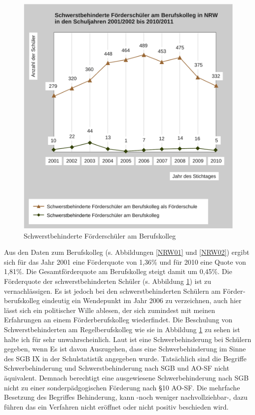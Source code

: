 \begin{figure}[htbp]
\centering
\includegraphics[width=\ScaleIfNeeded]{nrw03.pdf}%
\caption{Schwerstbehinderte Förderschüler am Berufskolleg}%
\label{NRW03}
\end{figure}

Aus den Daten zum Berufskolleg (s. Abbildungen \ref{NRW01} und \ref{NRW02}) ergibt sich für das Jahr 2001 eine Förderquote von 1,36\% und für 2010 eine Quote von 1,81\%.  Die Gesamt­förder­quote am Berufskolleg steigt damit um 0,45\%. Die Förderquote der schwerstbehinderten Schüler (s. Abbildung \ref{NRW03}) ist zu vernachlässigen. Es ist jedoch bei den schwerst­behinderten Schülern am Förder­berufs­kolleg eindeutig ein Wendepunkt im Jahr 2006 zu verzeichnen, auch hier lässt sich ein politischer Wille ablesen, der sich zumindest mit meinen Erfahrungen an einem Förderberufskolleg wiederfindet. Die Beschulung von Schwerstbehinderten am Regelberufskolleg wie sie in Abbildung \ref{NRW03} zu sehen ist halte ich für sehr unwahrscheinlich. Laut \citep{AOSF:05} ist eine Schwerbehinderung bei Schülern gegeben, wenn 
Es ist davon Auszugehen, dass eine Schwerbehinderung im Sinne des SGB IX in der Schulstatistik angegeben wurde. Tatsächlich sind die Begriffe Schwerbehinderung und Schwerstbehinderung nach SGB und AO-SF nicht äquivalent. Demnach berechtigt eine ausgewiesene Schwerbehinderung nach SGB nicht zu einer sonderpädgogischen Förderung nach §10 AO-SF. Die mehrfache Besetzung des Begriffes \hypertarget{Behi}{Behinderung}, kann -noch weniger nachvollziehbar-, dazu führen das ein Verfahren nicht eröffnet oder nicht positiv beschieden wird.








